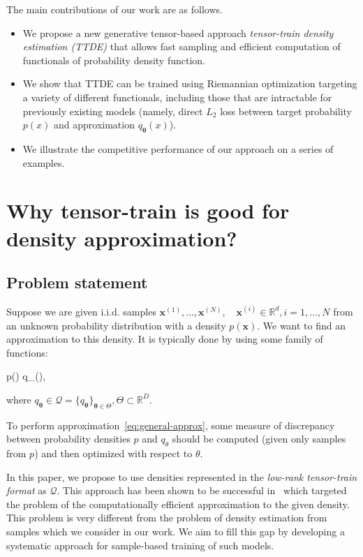 \documentclass[accepted]{uai2021}
\newcommand\R{\mathbb{R}}
\renewcommand\vec{\boldsymbol}
\newcommand\set{\mathcal}
\begin{document}
  The main contributions of our work are as follows.
  \begin{itemize}
    \item We propose a new generative tensor-based approach \textit{tensor-train density estimation (TTDE)} that allows fast sampling and efficient computation of functionals of probability density function.

    \item We show that TTDE can be trained using Riemannian optimization targeting a variety of different functionals, including those that are intractable for previously existing models (namely, direct $L_2$ loss between target probability $p(x)$ and approximation $q_{\vec{\theta}}(x)$).

    \item We illustrate the competitive performance of our approach on a series of examples.
  \end{itemize}


  \section{Why tensor-train is good for density approximation?}
  \label{sec:theory}

  \subsection{Problem statement}
  Suppose we are given i.i.d. samples $\vec{x}^{(1)}, \ldots, \vec{x}^{(N)}, \quad \vec{x}^{(i)} \in \mathbb{R}^d, i=1, \ldots, N$ from an unknown probability distribution with a density $p(\vec{x})$. We want to find an approximation to this density. It is typically done by using some family of functions:
  \begin{EQA}[c]
    \label{eq:general-approx}
    p(\vec{x}) \approx q_{\vec{\theta}}(\vec{x}),
  \end{EQA}
  where \(q_{\vec{\theta}} \in \set{Q} = \{ q_{\vec{\theta}} \}_{\vec{\theta} \in \Theta}, \Theta \subset \R^D\).

  To perform approximation~\eqref{eq:general-approx}, some measure of discrepancy between probability densities $p$ and $q_\theta$ should be computed (given only samples from $p$) and then optimized with respect to $\theta$.

  In this paper, we propose to use densities represented in the \emph{low-rank tensor-train format} as $\set{Q}$. This approach has been shown to be successful in~\citep{Dolgov2020} which targeted the problem of the computationally efficient approximation to the given density. This problem is very different from the problem of density estimation from samples which we consider in our work. We aim to fill this gap by developing a systematic approach for sample-based training of such models.
\end{document}
